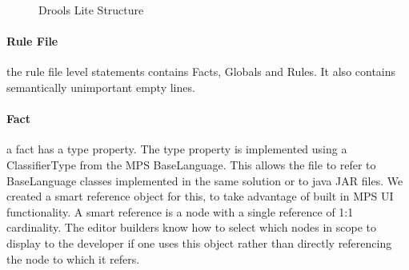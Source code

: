 \begin{figure}[htbp]
    \centering
    \caption{Drools Lite Structure}
    \label{fig:DroolsLiteDiagram}
\end{figure}
 
\paragraph{Rule File} the rule file level statements contains Facts, Globals and Rules.
It also contains semantically unimportant empty lines.

\paragraph{Fact} a fact has a type property.
The type property is implemented using a ClassifierType from the MPS BaseLanguage.
This allows the file to refer to BaseLanguage classes implemented in the same solution or to java JAR files.
We created a smart reference object for this, to take advantage of built in MPS UI functionality.
A smart reference is a node with a single reference of 1:1 cardinality.
The editor builders know how to select which nodes in scope to display to the developer if one uses this object rather than directly referencing the node to which it refers.

